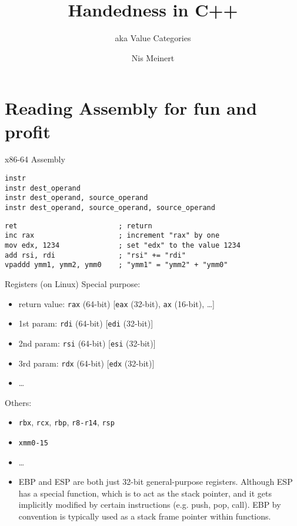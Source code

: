 \documentclass[compress,aspectratio=1610]{beamer}
\title{Handedness in C++}
\subtitle{aka Value Categories}
\institute{iCSC 2019}
\author{Nis Meinert}
\begin{document}
\maketitle

\section{Reading Assembly for fun and profit}

\begin{frame}[fragile]{x86-64 Assembly}
    \begin{lstlisting}[language={}]
instr
instr dest_operand
instr dest_operand, source_operand
instr dest_operand, source_operand, source_operand
    \end{lstlisting}

    \begin{lstlisting}[language={}]
ret                        ; return
inc rax                    ; increment "rax" by one
mov edx, 1234              ; set "edx" to the value 1234
add rsi, rdi               ; "rsi" += "rdi"
vpaddd ymm1, ymm2, ymm0    ; "ymm1" = "ymm2" + "ymm0"
    \end{lstlisting}
\end{frame}

\begin{frame}{Registers (on Linux)}
    Special purpose:
    \begin{itemize}
        \item return value: \texttt{rax} (64-bit) [\texttt{eax} (32-bit), \texttt{ax} (16-bit), \ldots]
        \item 1st param: \texttt{rdi} (64-bit) [\texttt{edi} (32-bit)]
        \item 2nd param: \texttt{rsi} (64-bit) [\texttt{esi} (32-bit)]
        \item 3rd param: \texttt{rdx} (64-bit) [\texttt{edx} (32-bit)]
        \item \ldots
    \end{itemize}

    Others:
    \begin{itemize}
        \item \texttt{rbx}, \texttt{rcx}, \texttt{rbp}, \texttt{r8-r14}, \texttt{rsp}
        \item \texttt{xmm0-15}
        \item \ldots
    \end{itemize}
\end{frame}

\begin{frame}[plain]
    \begin{itemize}
        \item EBP and ESP are both just 32-bit general-purpose registers. Although ESP has a special function, which is to act as the stack pointer, and it gets implicitly modified by certain instructions (e.g. push, pop, call). EBP by convention is typically used as a stack frame pointer within functions.
    \end{itemize}
\end{frame}
\end{document}
